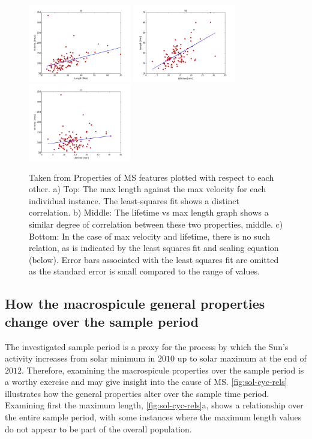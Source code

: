 \begin{figure}[h!]
	\centering
	\includegraphics[width=0.4\textwidth]{Chapter3/Figs/length_max_vs.pdf}
	\includegraphics[width=0.4\textwidth]{Chapter3/Figs/lifetime_vs_length.pdf}
	\includegraphics[width=0.4\textwidth]{Chapter3/Figs/velocity_vs_lt.pdf}
	\caption{\small Taken from \cite{Bennett2015} Properties of MS features plotted with respect to each other. a) Top: The max length against the max velocity for each individual instance. The least-squares fit shows a distinct correlation. b) Middle: The lifetime vs max length graph shows a similar degree of correlation between these two properties, middle. c) Bottom: In the case of max velocity and lifetime, there is no such relation, as is indicated by the least squares fit and scaling equation (below). Error bars associated with the least squares fit are omitted as the standard error is small compared to the range of values.}
	\label{fig:prop-rel}	
\end{figure}


\subsection{How the macrospicule general properties change over the sample period}
The investigated sample period is a proxy for the process by which the Sun's activity increases from solar minimum in $2010$ up to solar maximum at the end of $2012$. Therefore, examining the macrospicule properties over the sample period is a worthy exercise and may give insight into the cause of MS. \cref{fig:sol-cyc-rels} illustrates how the general properties alter over the sample time period. Examining first the maximum length, \cref{fig:sol-cyc-rels}a, shows a relationship over the entire sample period, with some instances where the maximum length values do not appear to be part of the overall population. 

